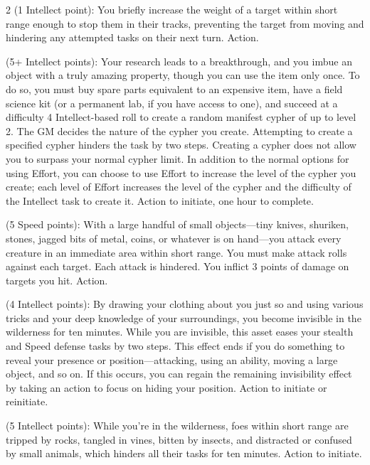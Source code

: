 \begin{multicols}{2}
 (1 Intellect point): You briefly increase the weight of a target within short range enough to stop them in their tracks, preventing the target from moving and hindering any attempted tasks on their next turn. Action. 
 
 (5+ Intellect points): Your research leads to a breakthrough, and you imbue an object with a truly amazing property, though you can use the item only once. To do so, you must buy spare parts equivalent to an expensive item, have a field science kit (or a permanent lab, if you have access to one), and succeed at a difficulty 4 Intellect-based roll to create a random manifest cypher of up to level 2. The GM decides the nature of the cypher you create. Attempting to create a specified cypher hinders the task by two steps. Creating a cypher does not allow you to surpass your normal cypher limit. In addition to the normal options for using Effort, you can choose to use Effort to increase the level of the cypher you create; each level of Effort increases the level of the cypher and the difficulty of the Intellect task to create it. Action to initiate, one hour to complete. 
 
 (5 Speed points): With a large handful of small objects—tiny knives, shuriken, stones, jagged bits of metal, coins, or whatever is on hand—you attack every creature in an immediate area within short range. You must make attack rolls against each target. Each attack is hindered. You inflict 3 points of damage on targets you hit. Action.
 
 (4 Intellect points): By drawing your clothing about you just so and using various tricks and your deep knowledge of your surroundings, you become invisible in the wilderness for ten minutes. While you are invisible, this asset eases your stealth and Speed defense tasks by two steps. This effect ends if you do something to reveal your presence or position—attacking, using an ability, moving a large object, and so on. If this occurs, you can regain the remaining invisibility effect by taking an action to focus on hiding your position. Action to initiate or reinitiate. 
 
 (5 Intellect points): While you’re in the wilderness, foes within short range are tripped by rocks, tangled in vines, bitten by insects, and distracted or confused by small animals, which hinders all their tasks for ten minutes. Action to initiate. 


\end{multicols}
